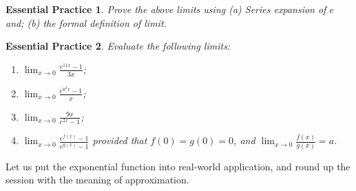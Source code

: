 \documentclass[12pt]{article}
\newtheorem{exercise}{Essential Practice}[section]
\begin{document}
    \begin{exercise}
        Prove the above limits using (a) Series expansion of $e$ and; (b) the formal definition of limit.
    \end{exercise}

    \begin{exercise}
        Evaluate the following limits:\begin{enumerate}
            \item $\displaystyle\lim_{x\to 0}\frac{e^{11x}-1}{3x}$;
            \item $\displaystyle\lim_{x\to 0}\frac{e^{k^2 x}-1}{x}$;
            \item $\displaystyle\lim_{x\to 0}\frac{9x}{e^{2x}-1}$;
            \item $\displaystyle\lim_{x\to 0}\frac{e^{f(x)}-1}{e^{g(x)}-1}$ provided that $f(0)=g(0)=0$, and $\displaystyle\lim_{x\to 0}\frac{f(x)}{g(x)}=a$.
        \end{enumerate}
    \end{exercise}

    Let us put the exponential function into real-world application, and round up the session with the meaning of approximation.
\end{document}

